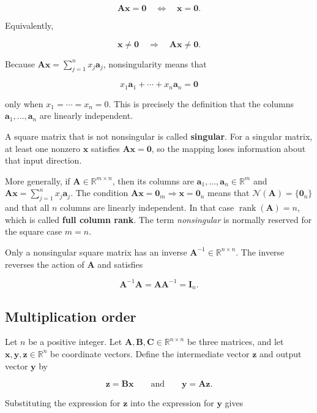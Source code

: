 \documentclass[
  australian,
  12pt,
  letterpaper,
  DIV=11,
  numbers=noendperiod,
  twoside]{scrreprt}
\begin{document}
\[
\mathbf A\mathbf x=\mathbf 0
\quad\Longleftrightarrow\quad
\mathbf x=\mathbf 0.
\]

Equivalently,

\[
\mathbf x\neq\mathbf 0
\quad\Longrightarrow\quad
\mathbf A\mathbf x\neq\mathbf 0.
\]

Because \(\mathbf A\mathbf x=\sum_{j=1}^{n}x_j\mathbf a_j\),
nonsingularity means that

\[
x_1\mathbf a_1+\cdots+x_n\mathbf a_n=\mathbf 0
\]

only when \(x_1=\cdots=x_n=0\). This is precisely the definition that
the columns \(\mathbf a_1,\ldots,\mathbf a_n\) are linearly independent.

A square matrix that is not nonsingular is called \textbf{singular}. For
a singular matrix, at least one nonzero \(\mathbf x\) satisfies
\(\mathbf A\mathbf x=\mathbf 0\), so the mapping loses information about
that input direction.

More generally, if \(\mathbf A\in\mathbb R^{m\times n}\), then its
columns are \(\mathbf a_1,\ldots,\mathbf a_n\in\mathbb R^m\) and
\(\mathbf A\mathbf x=\sum_{j=1}^{n}x_j\mathbf a_j\). The condition
\(\mathbf A\mathbf x=\mathbf 0_m\Rightarrow\mathbf x=\mathbf 0_n\) means
that \(\mathcal N(\mathbf A)=\{\mathbf 0_n\}\) and that all \(n\)
columns are linearly independent. In that case
\(\operatorname{rank}(\mathbf A)=n\), which is called \textbf{full
column rank}. The term \emph{nonsingular} is normally reserved for the
square case \(m=n\).

Only a nonsingular square matrix has an inverse
\(\mathbf A^{-1}\in\mathbb R^{n\times n}\). The inverse reverses the
action of \(\mathbf A\) and satisfies

\[
\mathbf{A}^{-1}\mathbf{A}=\mathbf{A}\mathbf{A}^{-1}=\mathbf{I}_n.
\]

\subsection{Multiplication order}\label{multiplication-order}

Let \(n\) be a positive integer. Let
\(\mathbf A,\mathbf B,\mathbf C\in\mathbb R^{n\times n}\) be three
matrices, and let \(\mathbf x,\mathbf y,\mathbf z\in\mathbb R^n\) be
coordinate vectors. Define the intermediate vector \(\mathbf z\) and
output vector \(\mathbf y\) by

\[
\mathbf z=\mathbf B\mathbf x
\qquad\text{and}\qquad
\mathbf y=\mathbf A\mathbf z.
\]

Substituting the expression for \(\mathbf z\) into the expression for
\(\mathbf y\) gives
\end{document}
